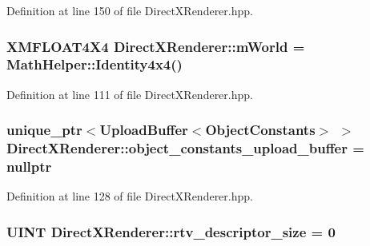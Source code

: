 Definition at line 150 of file Direct\+X\+Renderer.\+hpp.

\subsubsection[{\texorpdfstring{m\+World}{mWorld}}]{\setlength{\rightskip}{0pt plus 5cm}X\+M\+F\+L\+O\+A\+T4\+X4 Direct\+X\+Renderer\+::m\+World = {\bf Math\+Helper\+::\+Identity4x4}()\hspace{0.3cm}{\ttfamily [protected]}}\hypertarget{class_direct_x_renderer_a3a4030d42352ab1e62f5e89f094a0152_a3a4030d42352ab1e62f5e89f094a0152}{}\label{class_direct_x_renderer_a3a4030d42352ab1e62f5e89f094a0152_a3a4030d42352ab1e62f5e89f094a0152}


Definition at line 111 of file Direct\+X\+Renderer.\+hpp.

\subsubsection[{\texorpdfstring{object\+\_\+constants\+\_\+upload\+\_\+buffer}{object_constants_upload_buffer}}]{\setlength{\rightskip}{0pt plus 5cm}unique\+\_\+ptr$<${\bf Upload\+Buffer}$<${\bf Object\+Constants}$>$ $>$ Direct\+X\+Renderer\+::object\+\_\+constants\+\_\+upload\+\_\+buffer = nullptr\hspace{0.3cm}{\ttfamily [protected]}}\hypertarget{class_direct_x_renderer_ae69d39730c18ec7f8ef2bea3b30cb560_ae69d39730c18ec7f8ef2bea3b30cb560}{}\label{class_direct_x_renderer_ae69d39730c18ec7f8ef2bea3b30cb560_ae69d39730c18ec7f8ef2bea3b30cb560}


Definition at line 128 of file Direct\+X\+Renderer.\+hpp.

\subsubsection[{\texorpdfstring{rtv\+\_\+descriptor\+\_\+size}{rtv_descriptor_size}}]{\setlength{\rightskip}{0pt plus 5cm}U\+I\+NT Direct\+X\+Renderer\+::rtv\+\_\+descriptor\+\_\+size = 0\hspace{0.3cm}{\ttfamily [protected]}}\hypertarget{class_direct_x_renderer_a192899db0ebd9b8632fe9300f02b226a_a192899db0ebd9b8632fe9300f02b226a}{}\label{class_direct_x_renderer_a192899db0ebd9b8632fe9300f02b226a_a192899db0ebd9b8632fe9300f02b226a}


